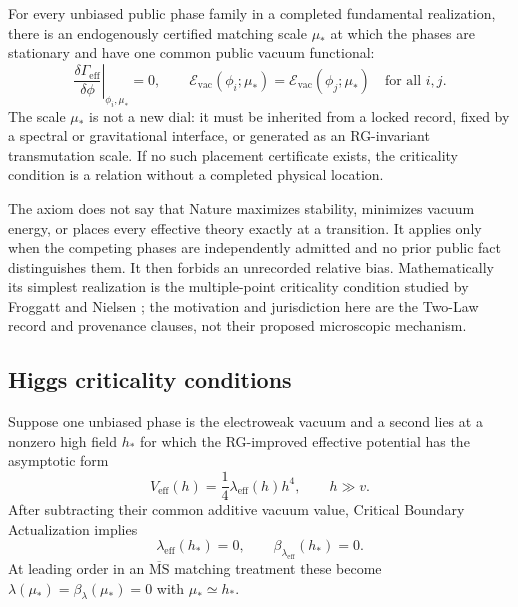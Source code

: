 \begin{axiom}
\label{ax:critical-boundary-actualization}
For every unbiased public phase family in a completed fundamental realization,
there is an endogenously certified matching scale $\mu_*$ at which the phases are
stationary and have one common public vacuum functional:
\[
 \left.\frac{\delta\Gamma_{\mathrm{eff}}}{\delta\phi}\right|_{\phi_i,\mu_*}=0,
 \qquad
 \mathcal E_{\mathrm{vac}}(\phi_i;\mu_*)
 =\mathcal E_{\mathrm{vac}}(\phi_j;\mu_*)
 \quad\text{for all }i,j.
\]
The scale $\mu_*$ is not a new dial: it must be inherited from a locked record,
fixed by a spectral or gravitational interface, or generated as an RG-invariant
transmutation scale.  If no such placement certificate exists, the criticality
condition is a relation without a completed physical location.
\end{axiom}

\begin{remark}
The axiom does not say that Nature maximizes stability, minimizes vacuum energy, or
places every effective theory exactly at a transition.  It applies only when the
competing phases are independently admitted and no prior public fact distinguishes
them.  It then forbids an unrecorded relative bias.  Mathematically its simplest
realization is the multiple-point criticality condition studied by Froggatt and
Nielsen \cite{froggatt-nielsen-mpp}; the motivation and jurisdiction here are the
Two-Law record and provenance clauses, not their proposed microscopic mechanism.
\end{remark}

\subsection{Higgs criticality conditions}

\begin{theorem}
\label{thm:cba-higgs-double-zero}
Suppose one unbiased phase is the electroweak vacuum and a second lies at a
nonzero high field $h_*$ for which the RG-improved effective potential has the
asymptotic form
\[
 V_{\mathrm{eff}}(h)
 =\frac14\lambda_{\mathrm{eff}}(h)h^4,
 \qquad h\gg v.
\]
After subtracting their common additive vacuum value, Critical Boundary
Actualization implies
\[
 \boxed{
 \lambda_{\mathrm{eff}}(h_*)=0,
 \qquad
 \beta_{\lambda_{\mathrm{eff}}}(h_*)=0.}
\]
At leading order in an $\overline{\mathrm{MS}}$ matching treatment these become
$\lambda(\mu_*)=\beta_\lambda(\mu_*)=0$ with $\mu_*\simeq h_*$.
\end{theorem}


